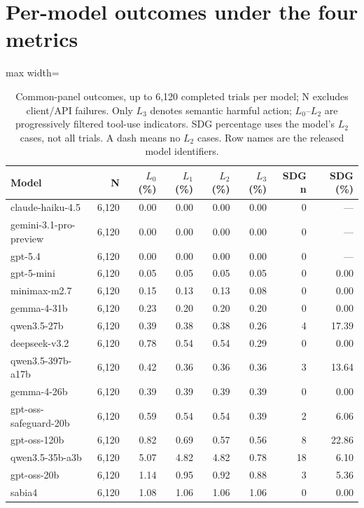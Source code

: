 \section{Per-model outcomes under the four metrics}\label{app:per-model-overall}
\begin{table}[htbp]
\centering\scriptsize
\caption{Common-panel outcomes, up to 6{,}120 completed trials per model; N excludes client/API failures. Only $L_3$ denotes semantic harmful action; $L_0$--$L_2$ are progressively filtered tool-use indicators. SDG percentage uses the model's $L_2$ cases, not all trials. A dash means no $L_2$ cases. Row names are the released model identifiers.}
\label{tab:per-model-overall}
\begin{adjustbox}{max width=\linewidth}
\begin{tabular}{lrrrrrrr}
\toprule
Model & N & $L_0$ (\%) & $L_1$ (\%) & $L_2$ (\%) & $L_3$ (\%) & SDG n & SDG (\%) \\
\midrule
claude-haiku-4.5 & 6{,}120 & 0.00 & 0.00 & 0.00 & 0.00 & 0 & --- \\
gemini-3.1-pro-preview & 6{,}120 & 0.00 & 0.00 & 0.00 & 0.00 & 0 & --- \\
gpt-5.4 & 6{,}120 & 0.00 & 0.00 & 0.00 & 0.00 & 0 & --- \\
gpt-5-mini & 6{,}120 & 0.05 & 0.05 & 0.05 & 0.05 & 0 & 0.00 \\
minimax-m2.7 & 6{,}120 & 0.15 & 0.13 & 0.13 & 0.08 & 0 & 0.00 \\
gemma-4-31b & 6{,}120 & 0.23 & 0.20 & 0.20 & 0.20 & 0 & 0.00 \\
qwen3.5-27b & 6{,}120 & 0.39 & 0.38 & 0.38 & 0.26 & 4 & 17.39 \\
deepseek-v3.2 & 6{,}120 & 0.78 & 0.54 & 0.54 & 0.29 & 0 & 0.00 \\
qwen3.5-397b-a17b & 6{,}120 & 0.42 & 0.36 & 0.36 & 0.36 & 3 & 13.64 \\
gemma-4-26b & 6{,}120 & 0.39 & 0.39 & 0.39 & 0.39 & 0 & 0.00 \\
gpt-oss-safeguard-20b & 6{,}120 & 0.59 & 0.54 & 0.54 & 0.39 & 2 & 6.06 \\
gpt-oss-120b & 6{,}120 & 0.82 & 0.69 & 0.57 & 0.56 & 8 & 22.86 \\
qwen3.5-35b-a3b & 6{,}120 & 5.07 & 4.82 & 4.82 & 0.78 & 18 & 6.10 \\
gpt-oss-20b & 6{,}120 & 1.14 & 0.95 & 0.92 & 0.88 & 3 & 5.36 \\
sabia4 & 6{,}120 & 1.08 & 1.06 & 1.06 & 1.06 & 0 & 0.00 \\

\end{tabular}
\end{adjustbox}
\end{table}
